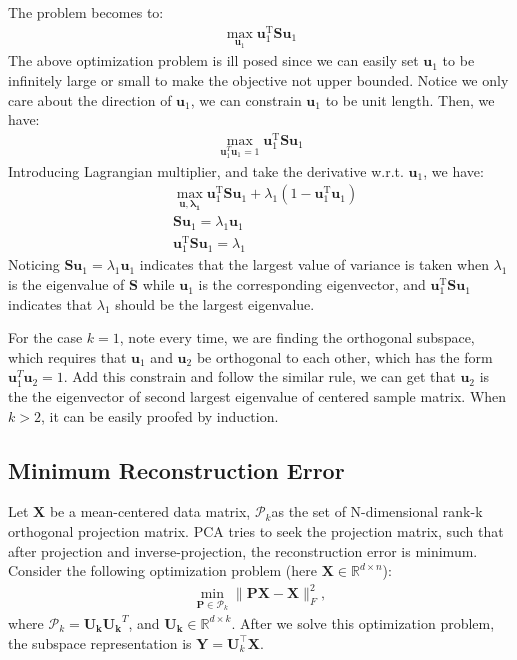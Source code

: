 \documentclass{article}
\begin{document}
The problem becomes to:
\begin{align*}
\max_{\mathbf{u}_1}\mathbf{u}_{1}^{\mathrm{T}} \mathbf{S} \mathbf{u}_{1}
\end{align*}
The above optimization problem is ill posed since we can easily set $\mathbf{u}_1$ to be infinitely large or small to make the objective not upper bounded. Notice we only care about the direction of $\mathbf{u}_1$, we can constrain $\mathbf{u}_1$ to be unit length. Then, we have:
\begin{align*}
\max_{\mathbf{u}_1^{T}\mathbf{u}_1=1}\mathbf{u}_{1}^{\mathrm{T}} \mathbf{S} \mathbf{u}_{1}
\end{align*}
Introducing Lagrangian multiplier, and take the derivative w.r.t. $\mathbf{u}_1$, we have:
\begin{align*}
&\max_{\mathbf{u, \lambda_1}}\mathbf{u}_{1}^{\mathrm{T}} \mathbf{S} \mathbf{u}_{1}+\lambda_{1}\left(1-\mathbf{u}_{1}^{\mathrm{T}} \mathbf{u}_{1}\right)\\
&\mathbf{S u}_{1}=\lambda_{1} \mathbf{u}_{1}\\
&\mathbf{u}_{1}^{\mathrm{T}} \mathbf{S} \mathbf{u}_{1}=\lambda_{1}
\end{align*}
Noticing $\mathbf{S u}_{1}=\lambda_{1} \mathbf{u}_{1}$ indicates that the largest value of variance is taken when $\lambda_1$ is the eigenvalue of $\mathbf{S}$ while $\mathbf{u}_1$ is the corresponding eigenvector, and $\mathbf{u}_{1}^{\mathrm{T}} \mathbf{S} \mathbf{u}_{1}$ indicates that $\lambda_1$ should be the largest eigenvalue.

For the case $k = 1$, note every time, we are finding the orthogonal subspace, which requires that $\mathbf{u}_1$ and $\mathbf{u}_2$ be orthogonal to each other, which has the form $\mathbf{u}_1^{T}\mathbf{u}_2 = 1$. Add this constrain and follow the similar rule, we can get that $\mathbf{u}_2$ is the the eigenvector of second largest eigenvalue of centered sample matrix. When $k > 2$, it can be easily proofed by induction.

\subsection{Minimum Reconstruction Error} 
Let $\mathbf{X}$ be a mean-centered data matrix, $\mathcal{P}_{k}$as the set of N-dimensional rank-k orthogonal projection matrix. PCA tries to seek the projection matrix, such that after projection and inverse-projection, the reconstruction error is minimum. Consider the following optimization problem (here $\mathbf{X}\in \mathbb{R}^{d \times n}$):
\begin{align*}
\min _{\mathbf{P} \in \mathcal{P}_{k}}\|\mathbf{P} \mathbf{X}-\mathbf{X}\|_{F}^{2},
\end{align*}
where $\mathcal{P}_{k}  = \mathbf{U_k}\mathbf{U_k}^{T}$, and $\mathbf{U_k} \in \mathbb{R}^{d \times k}$. After we solve this optimization problem, the subspace representation is $\mathbf{Y}=\mathbf{U}_{k}^{\top} \mathbf{X}$. 
\end{document}

